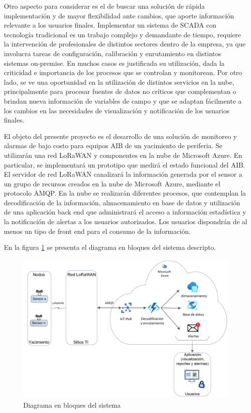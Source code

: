 \documentclass[
11pt, %
]{charter}
\begin{document}
Otro aspecto para considerar es el de buscar una solución de rápida implementación y de mayor flexibilidad ante cambios, que aporte información relevante a los usuarios finales. Implementar un sistema de SCADA con tecnología tradicional es un trabajo complejo y demandante de tiempo, requiere la intervención de profesionales de distintos sectores dentro de la empresa, ya que involucra tareas de configuración, calibración y enrutamiento en distintos sistemas on-premise. En muchos casos es justificada su utilización, dada la criticidad e importancia de los procesos que se controlan y monitorean. Por otro lado, se ve una oportunidad en la utilización de distintos servicios en la nube, principalmente para procesar fuentes de datos no críticos que complementan o brindan nueva información de variables de campo y que se adaptan fácilmente a los cambios en las necesidades de visualización y notificación de los usuarios finales.

El objeto del presente proyecto es el desarrollo de una solución de monitoreo y alarmas de bajo costo para equipos AIB de un yacimiento de periferia. Se utilizarán una red LoRaWAN y componentes en la nube de Microsoft Azure.
En particular, se implementará un prototipo que medirá el estado funcional del AIB. El servidor de red LoRaWAN canalizará la información generada por el sensor a un grupo de recursos creados en la nube de Microsoft Azure, mediante el protocolo AMQP.
En la nube se realizarán diferentes procesos, que contemplan la decodificación de la información, almacenamiento en base de datos y utilización de una aplicación back end que administrará el acceso a información estadística y la notificación de alertas a los usuarios autorizados.
Los usuarios dispondrán de al menos un tipo de front end para el consumo de la información.

En la figura \ref{fig:diagBloques} se presenta el diagrama en bloques del sistema descripto.


\begin{figure}[htpb]
\centering 
\includegraphics[width=.8\textwidth]{./Figuras/diagrama_bloques_conceptual2.png}
\caption{Diagrama en bloques del sistema}
\label{fig:diagBloques}
\end{figure}
\end{document}
